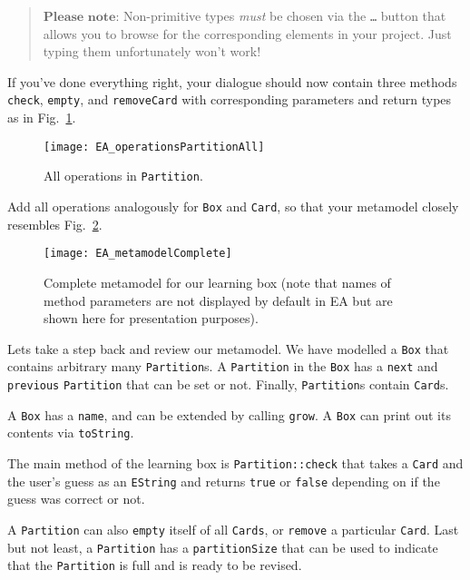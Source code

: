 \vspace{-.5cm}
\begin{quote}
$\textbf{Please note:}$ Non-primitive types \emph{must} be chosen via the \texttt{\ldots} button that allows you to browse for the corresponding elements in your project.
Just typing them unfortunately won't work!
\end{quote}
\vspace{-.5cm}

If you've done everything right, your dialogue should now contain three methods \texttt{check}, \texttt{empty}, and \texttt{removeCard} with corresponding parameters and return types as in Fig.~\ref{fig:operation_partition}.
\begin{figure}[htbp]
	\centering
  \texttt{[image: EA\_operationsPartitionAll]}
	\caption{All operations in \texttt{Partition}.}
	\label{fig:operation_partition}
\end{figure}

Add all operations analogously for \texttt{Box} and \texttt{Card}, so that your metamodel closely resembles Fig.~\ref{fig:metamodel_complete}.

\begin{figure}[htbp]
	\centering
  \texttt{[image: EA\_metamodelComplete]}
	\caption[Complete metamodel for our learning box.]{Complete metamodel for our learning box (note that names of method parameters are not displayed by default in EA but are shown here for presentation purposes).}
	\label{fig:metamodel_complete}
\end{figure}

Lets take a step back and review our metamodel.
We have modelled a \texttt{Box} that contains arbitrary many \texttt{Partition}s.
A \texttt{Partition} in the \texttt{Box} has a \texttt{next} and \texttt{previous} \texttt{Partition} that can be set or not. Finally, \texttt{Partition}s contain \texttt{Card}s.

A \texttt{Box} has a \texttt{name}, and can be extended by calling \texttt{grow}.
A \texttt{Box} can print out its contents via \texttt{toString}.

The main method of the learning box is \texttt{Partition::check} that takes a \texttt{Card} and the user's guess as an \texttt{EString} and returns \texttt{true} or \texttt{false} depending on if the guess was correct or not.

A \texttt{Partition} can also \texttt{empty} itself of all \texttt{Cards}, or \texttt{remove} a particular \texttt{Card}.
Last but not least, a \texttt{Partition} has a \texttt{partitionSize} that can be used to indicate that the \texttt{Partition} is full and is ready to be revised.

